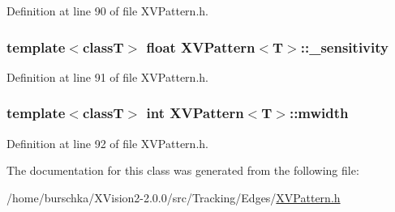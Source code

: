 Definition at line 90 of file XVPattern.h.\label{XVPattern_n2}
\hypertarget{class_XVPattern_n2}{
\subsubsection[_sensitivity]{\setlength{\rightskip}{0pt plus 5cm}template$<$classT$>$ float XVPattern$<$T$>$::\_\-sensitivity}}




Definition at line 91 of file XVPattern.h.\label{XVPattern_n3}
\hypertarget{class_XVPattern_n3}{
\subsubsection[mwidth]{\setlength{\rightskip}{0pt plus 5cm}template$<$classT$>$ int XVPattern$<$T$>$::mwidth}}




Definition at line 92 of file XVPattern.h.

The documentation for this class was generated from the following file:\begin{CompactItemize}
\item 
/home/burschka/XVision2-2.0.0/src/Tracking/Edges/\hyperlink{XVPattern.h-source}{XVPattern.h}\end{CompactItemize}
